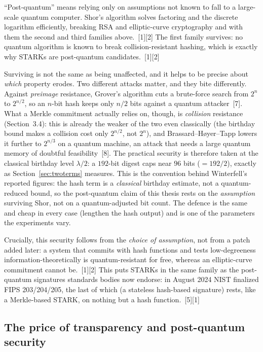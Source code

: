 \documentclass[11pt]{article}
\begin{document}
``Post-quantum'' means relying only on assumptions not known to fall to a large-scale quantum computer.
Shor's algorithm solves factoring and the discrete logarithm efficiently, breaking RSA and
elliptic-curve cryptography and with them the second and third families above.~[1][2] The first family
survives: no quantum algorithm is known to break collision-resistant hashing, which is exactly why
STARKs are post-quantum candidates.~[1][2]

Surviving is not the same as being unaffected, and it helps to be precise about \emph{which} property
erodes. Two different attacks matter, and they bite differently. Against \emph{preimage} resistance,
Grover's algorithm cuts a brute-force search from $2^{n}$ to $2^{n/2}$, so an $n$-bit hash keeps only
$n/2$ bits against a quantum attacker~[7]. What a Merkle commitment actually relies on, though, is
\emph{collision} resistance (Section~3.4): this is already the weaker of the two even classically
(the birthday bound makes a collision cost only $2^{n/2}$, not $2^{n}$), and Brassard--H\o yer--Tapp
lowers it further to $2^{n/3}$ on a quantum machine, an attack that needs a large quantum memory of
doubtful feasibility~[8]. The practical security is therefore taken at the classical birthday level
$\lambda/2$: a $192$-bit digest caps near $96$ bits ($=192/2$), exactly as Section~\ref{sec:twoterms}
measures. This is the convention behind Winterfell's reported figures: the hash term is a \emph{classical}
birthday estimate, not a quantum-reduced bound, so the post-quantum claim of this thesis rests on the
\emph{assumption} surviving Shor, not on a quantum-adjusted bit count. The defence is the same and cheap
in every case (lengthen the hash output) and is one of the parameters the experiments vary.

Crucially, this security follows from the \emph{choice of assumption}, not from a patch added later: a
system that commits with hash functions and tests low-degreeness information-theoretically is
quantum-resistant for free, whereas an elliptic-curve commitment cannot be.~[1][2] This puts STARKs in
the same family as the post-quantum signatures standards bodies now endorse: in August 2024 NIST
finalized FIPS 203/204/205, the last of which (a stateless hash-based signature) rests, like a
Merkle-based STARK, on nothing but a hash function.~[5][1]

\subsection{The price of transparency and post-quantum security}
\end{document}
